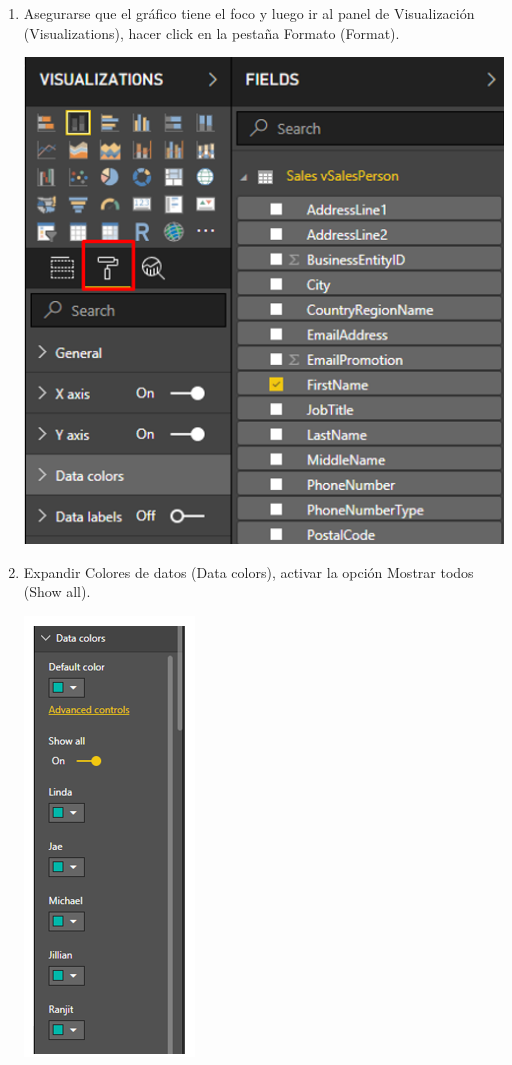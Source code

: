 \begin{itemize}
\begin{enumerate}
\item Asegurarse que el gráfico tiene el foco y luego ir al panel de Visualización (Visualizations), hacer click en la pestaña Formato (Format).
\begin{center}
\includegraphics[scale=0.55]{./Imagenes/5.png}
\end{center}

\item Expandir Colores de datos (Data colors), activar la opción Mostrar todos (Show all).
\begin{center}
\includegraphics[scale=0.55]{./Imagenes/6.png}
\end{center}


\end{enumerate}
\end{itemize}
